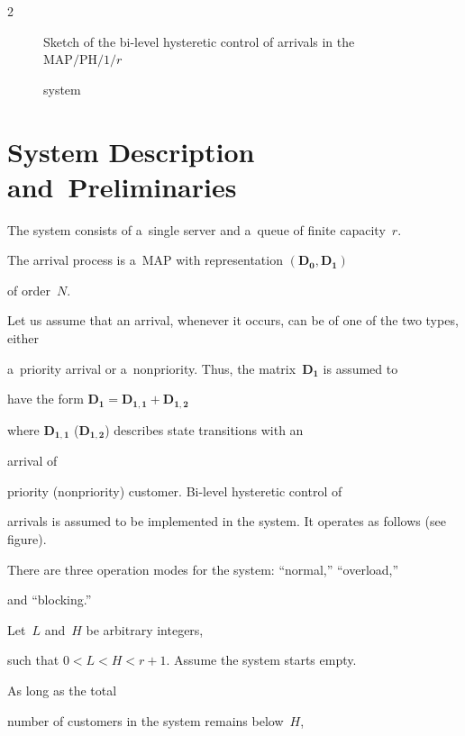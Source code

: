 \begin{multicols}{2}
\begin{figure}[b]
\begin{center}
{\small Sketch of the bi-level hysteretic control of arrivals in the $\mathrm{MAP}/\mathrm{PH}/1/r$ 


system}





 \end{center}


\end{figure}











\section{System Description and~Preliminaries}





\noindent


The system consists of a~single server and a~queue of finite capacity~$r$.


The arrival process is a~MAP with representation $(\mathbf{D_0}, \mathbf{D_1})$ 


of order~$N$.


Let us assume that an arrival, whenever it occurs, can be of one of the two types, either 


a~priority arrival or a~nonpriority. Thus, the matrix~$\mathbf{D_1}$ is assumed to


have the form $\mathbf{D_1}=\mathbf{D_{1,1}}+\mathbf{D_{1,2}}$


where $\mathbf{D_{1,1}}$ ($\mathbf{D_{1,2}}$) describes state transitions with an 


arrival of


priority (nonpriority) customer. Bi-level hysteretic control of 


arrivals is assumed to be implemented in the system. It operates as follows (see figure).


There are three operation modes for the system: ``normal,'' ``overload,'' 


and ``blocking.''


 Let~$L$ and~$H$ be arbitrary integers,


such that $0 < L < H < r+1$. Assume the system starts empty. 


As long as the total


number of customers in the system remains below~$H$,



\end{multicols}
